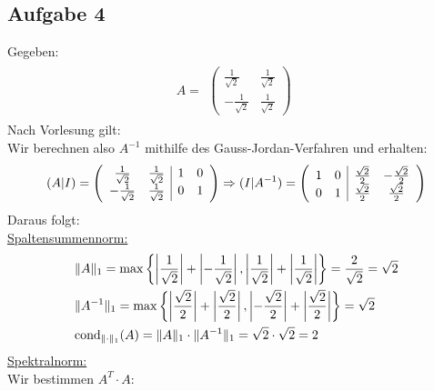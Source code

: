 \newpage
\subsection*{Aufgabe 4}
Gegeben:
\begin{align*} \label{eq8}
A=
\begin{split}
\begin{pmatrix}
\frac{1}{\sqrt2} & \frac{1}{\sqrt2} \\
-\frac{1}{\sqrt2} &\frac{1}{\sqrt2}
\end{pmatrix}
\end{split}
\end{align*}
Nach Vorlesung gilt: \\

Wir berechnen also $A^{-1}$ mithilfe des Gauss-Jordan-Verfahren und erhalten:
\begin{align*}
(A|I)=
\begin{split}
\begin{array}({cc|cc})
\frac{1}{\sqrt2} & \frac{1}{\sqrt2} & 1 & 0 \\
-\frac{1}{\sqrt2} &\frac{1}{\sqrt2} & 0 & 1
\end{array}
\Rightarrow(I|A^{-1})=
\begin{array}({cc|cc})
 1 & 0 & \frac{\sqrt2}{2} & -\frac{\sqrt2}{2} \\
 0 & 1 & \frac{\sqrt2}{2} & \frac{\sqrt2}{2}
\end{array}
\end{split}
\end{align*}
Daraus folgt:\\
\underline{Spaltensummennorm:}
\begin{align*}
\begin{split}
&\|A\|_1=\mathrm{max}\left\lbrace \left|\frac{1}{\sqrt2}\right|+\left|-\frac{1}{\sqrt2}\right|, \left|\frac{1}{\sqrt2}\right|+\left|\frac{1}{\sqrt2}\right|\right\rbrace=\frac{2}{\sqrt{2}} = \sqrt{2} \\
&\|A^{-1}\|_1=\mathrm{max}\left\lbrace\left|\frac{\sqrt2}{2}\right|+\left|\frac{\sqrt2}{2}\right|, \left|-\frac{\sqrt2}{2}\right|+\left|\frac{\sqrt2}{2}\right|\right\rbrace={\sqrt2}\\
& \mathrm{cond}_{\| \cdot \|_1}(A)=\|A\|_1\cdot\|A^{-1}\|_1={\sqrt{2}} \cdot  {\sqrt{2}}  = 2\\
\end{split}
\end{align*}
\underline{Spektralnorm:}\\
Wir bestimmen $A^T\cdot A$:\\

